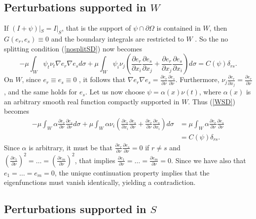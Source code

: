 \documentclass[a4paper,reqno,11pt,oneside]{amsart}
\theoremstyle{plain}
\theoremstyle{plain}
\theoremstyle{plain}
\theoremstyle{remark}
\begin{document}
\subsection{Perturbations supported in $W$}\label{SDpertW}

If $(I+\psi)|_S=I|_S$, that is the support of  $\psi\cap\partial \Omega$ is contained in $W$,  then 
$G(e_r,e_s)\equiv 0$ and the boundary integrals are restricted to $W$ . So the no splitting condition (\ref{nosplitSD}) now becomes
  \begin{equation}\label{WSD}
-\mu \int_{W}\psi_t \nu_t \nabla e_r\nabla e_sd\sigma +\mu \int_{W}
\psi_i \nu_j\left(\frac{\partial e_r}{\partial x_i}\frac{\partial e_s}{\partial x_j}+\frac{\partial e_r}{\partial x_j}\frac{\partial e_s}{\partial x_i}
\right) d\sigma=C(\psi)\delta_{rs}.
\end{equation}
On $W$, since $e_r\equiv e_s\equiv0$ , it follows that $ \nabla e_r \nabla e_s=\frac{\partial e_r}{\partial \nu }\frac{\partial e_s}{\partial \nu }$. Furthermore, $\nu_j\frac{\partial e_r}{\partial x_j}=\frac{\partial e_r}{\partial\nu}$, 
and the same holds for $e_s$. Let us now choose $\psi=\alpha(x)\nu(t)$, where $\alpha(x)$ is an arbitrary smooth real function compactly supported in $W$. Thus  (\ref{WSD}) becomes
$$\begin{aligned}
-\mu\int_{W}\alpha \frac{\partial e_r}{\partial \nu} 
\frac{\partial e_s}{\partial \nu}d\sigma
+\mu\int_{W}
\alpha \nu_i\left(\frac{\partial e_r}{\partial x_i}\frac{\partial e_s}{\partial \nu}+\frac{\partial e_r}{\partial \nu}\frac{\partial e_s}{\partial x_i}
\right) d\sigma&
=\mu\int_{W}\alpha \frac{\partial e_r}{\partial \nu} 
\frac{\partial e_s}{\partial \nu}
\\ &=C(\psi)\delta_{rs}.
\end{aligned}$$
Since $\alpha$ is arbitrary, it must be that $\frac{\partial e_r}{\partial \nu}\frac{\partial e_s}{\partial \nu}=0$ if $r\neq s$ and $\left(\frac{\partial e_1}{\partial \nu}\right)^2=\dots=\left(\frac{\partial e_m}{\partial \nu}\right)^2$, that implies $\frac{\partial e_1}{\partial \nu}=\dots=\frac{\partial e_m }{\partial \nu}=0$.  Since we have also that $e_1=\dots=e_m=0$, the unique continuation property implies that the eigenfunctions must vanish identically, yielding a contradiction.


\subsection{Perturbations supported in $S$}\label{SDpertS}
\end{document}
